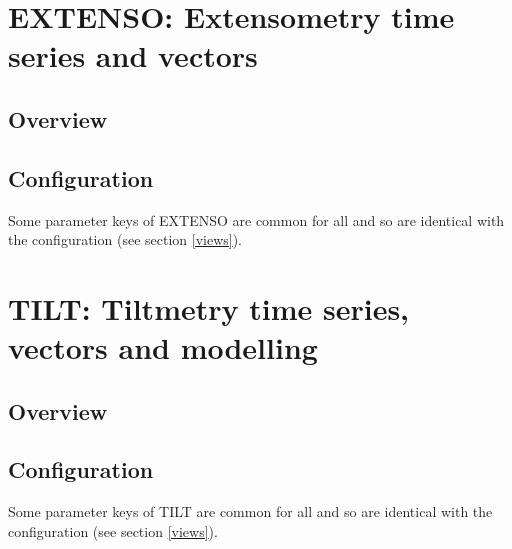 


\newpage
\section{EXTENSO: Extensometry time series and vectors}

\subsection{Overview}

\subsection{Configuration}

Some parameter keys of EXTENSO are common for all  and  so are identical with the  configuration (see section \ref{views}).




\section{TILT: Tiltmetry time series, vectors and modelling}

\subsection{Overview}

\subsection{Configuration}

Some parameter keys of TILT are common for all  and  so are identical with the  configuration (see section \ref{views}).




